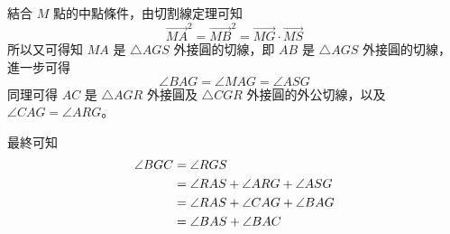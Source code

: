 \documentclass{article}
\begin{document}
結合 $M$ 點的中點條件，由切割線定理可知
\begin{equation}
  \overrightarrow{MA}^2=\overrightarrow{MB}^2=\overrightarrow{MG}\cdot\overrightarrow{MS}
\end{equation}
所以又可得知 $MA$ 是 $\triangle{AGS}$ 外接圓的切線，即 $AB$ 是 $\triangle{AGS}$ 外接圓的切線，進一步可得
\begin{equation}
  \angle{BAG}=\angle{MAG}=\angle{ASG}\label{eq:p5_s1}
\end{equation}
同理可得 $AC$ 是 $\triangle{AGR}$ 外接圓及 $\triangle{CGR}$ 外接圓的外公切線，以及 $\angle{CAG}=\angle{ARG}$。

最終可知
\begin{align}
  \angle{BGC}&=\angle{RGS}\notag\\
  &=\angle{RAS}+\angle{ARG}+\angle{ASG}\notag\\
  &=\angle{RAS}+\angle{CAG}+\angle{BAG}\notag\\
  &=\angle{BAS}+\angle{BAC}
\end{align}
\end{document}
